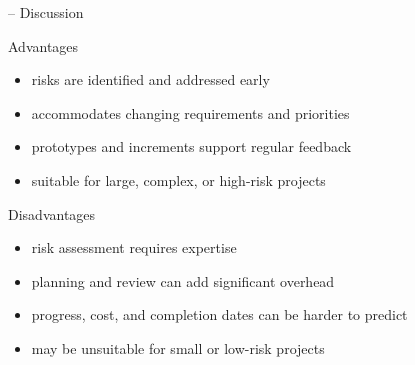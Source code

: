 \begin{frame}{\insertsubsection{} -- Discussion\ \mytitlesource{\sommerville}}
	\begin{fancycolumns}
		\begin{note}{Advantages}
			\begin{itemize}
				\item risks are identified and addressed early
				\item accommodates changing requirements and priorities
				\item prototypes and increments support regular feedback
				\item suitable for large, complex, or high-risk projects
			\end{itemize}
		\end{note}
		\nextcolumn
		\begin{note}{Disadvantages}
			\begin{itemize}
				\item risk assessment requires expertise
				\item planning and review can add significant overhead
				\item progress, cost, and completion dates can be harder to predict
				\item may be unsuitable for small or low-risk projects
			\end{itemize}
		\end{note}
	\end{fancycolumns}
\end{frame}



